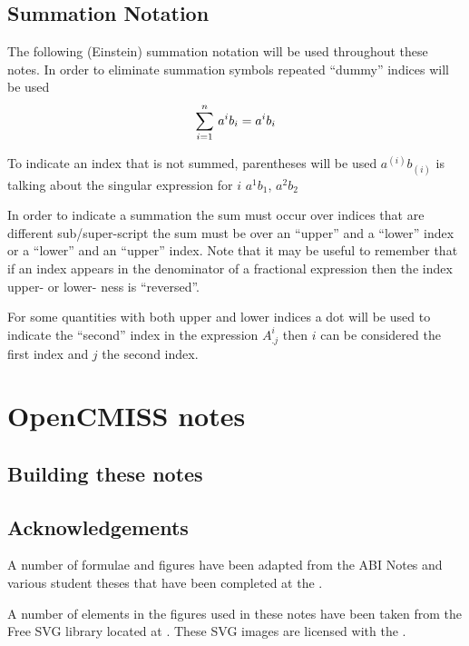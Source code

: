 \subsection{Summation Notation}
\label{subsec:IntroSummationNotation}

The following (Einstein) summation notation will be
used throughout these notes. In order to eliminate summation symbols repeated
``dummy'' indices will be used \ie
\begin{equation}
    \displaystyle\sum_{i=1}^{n} \,a^{i}b_{i} =a^{i}b_{i}
\end{equation}

To indicate an index that is not summed, parentheses will be used
\ie $a^{(i)}b_{(i)}$ is talking about the singular expression for $i$ \eg
$a^{1}b_{1}$, $a^{2}b_{2}$ \etc

In order to indicate a summation the sum must occur over indices that are
different sub/super-script \ie the sum must be over an ``upper'' and a
``lower'' index or a ``lower'' and an ``upper'' index. Note that it may be
useful to remember that if an index appears in the denominator of a fractional
expression then the index upper- or lower- ness is ``reversed''. 

For some quantities with both upper and lower indices a dot will be used to
indicate the ``second'' index \eg in the expression $A^{i}_{.j}$ then $i$ can
be considered the first index and $j$ the second index.

\section{OpenCMISS notes} 
\label{sec:IntroOpenCMISSNotes}

\subsection{Building these notes}
\label{subsec:IntroBuildingOpenCMISSNotes}

\subsection{Acknowledgements}
\label{subsec:IntroAcknowledgements}

A number of formulae and figures have been adapted from the ABI Notes
and various student theses that have been completed at the
.

A number of elements in the figures used in these notes have been
taken from the Free {SVG} library located at
. These {SVG} images are licensed with
the .
